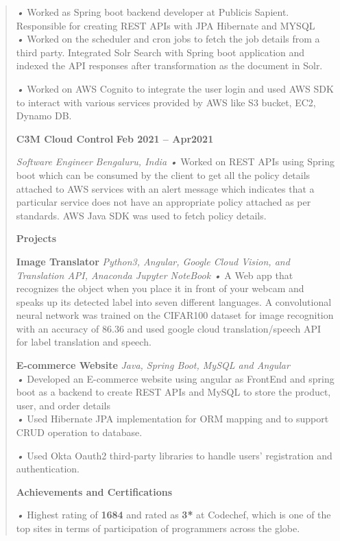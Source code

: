 \documentclass[
]{article}
\begin{document}
\begin{quote}
\emph{•} Worked as Spring boot backend developer at Publicis Sapient.
Responsible for creating REST APIs with JPA Hibernate and MYSQL\\
\emph{•} Worked on the scheduler and cron jobs to fetch the job details
from a third party. Integrated Solr Search with Spring boot application
and indexed the API responses after transformation as the document in
Solr.

\emph{•} Worked on AWS Cognito to integrate the user login and used AWS
SDK to interact with various services provided by AWS like S3 bucket,
EC2, Dynamo DB.

\textbf{C3M Cloud Control} \textbf{Feb 2021 -- Apr2021}

\emph{Software Engineer} \emph{Bengaluru, India} \emph{•} Worked on REST
APIs using Spring boot which can be consumed by the client to get all
the policy details attached to AWS services with an alert message which
indicates that a particular service does not have an appropriate policy
attached as per standards. AWS Java SDK was used to fetch policy
details.

\textbf{Projects}

\textbf{Image Translator} \emph{\textbar{} Python3, Angular, Google
Cloud Vision, and Translation API, Anaconda Jupyter NoteBook} \emph{•} A
Web app that recognizes the object when you place it in front of your
webcam and speaks up its detected label into seven different languages.
A convolutional neural network was trained on the CIFAR100 dataset for
image recognition with an accuracy of 86.36 and used google cloud
translation/speech API for label translation and speech.

\textbf{E-commerce Website} \emph{\textbar{} Java, Spring Boot, MySQL
and Angular}\\
\emph{•} Developed an E-commerce website using angular as FrontEnd and
spring boot as a backend to create REST APIs and MySQL to store the
product, user, and order details\\
\emph{•} Used Hibernate JPA implementation for ORM mapping and to
support CRUD operation to database.

\emph{•} Used Okta Oauth2 third-party libraries to handle users'
registration and authentication.

\textbf{Achievements and Certifications}

\emph{•} Highest rating of \textbf{1684} and rated as \textbf{3*} at
Codechef, which is one of the top sites in terms of participation of
programmers across the globe.


\end{quote}
\end{document}
